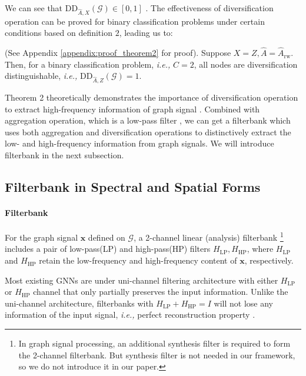 \documentclass{article}
\newcommand\ie{\textit{i.e.,}}
\newcommand{\0}{{\boldsymbol{0}}}
\newcommand{\6}{{\partial}}
\newcommand{\8}{{\infty}}
\newcommand{\4}{{\nabla}}
\newenvironment{theorem}[2][Theorem]{\begin{trivlist}
		\item[\hskip \labelsep {\bfseries #1}\hskip \labelsep {\bfseries #2.}]}{\end{trivlist}}
\begin{document}
\vspace*{-1mm}
We can see that $\mathrm{DD}_{\hat{A},X}(\mathcal{G}) \in [0,1]$ . The effectiveness of diversification operation can be proved for binary classification problems under certain conditions based on definition $2$, leading us to:
\begin{theorem} 2
(See Appendix \ref{appendix:proof_theorem2} for proof). 
Suppose $X=Z, \hat{A}=\hat{A}_{\text{rw}}$.
Then, for a binary classification problem, \ie{} $C=2$, all nodes are diversification distinguishable, \ie{} $\mathrm{DD}_{\hat{A},Z}(\mathcal{G})=1$.
\end{theorem}
Theorem 2 theoretically demonstrates the importance of diversification operation to extract high-frequency information of graph signal \cite{ekambaram2014graph}. Combined with aggregation operation, which is a low-pass filter \cite{ekambaram2014graph,maehara2019revisiting}, we can get a filterbank which uses both aggregation and diversification operations to distinctively extract the low- and high-frequency information from graph signals. We will introduce filterbank in the next subsection.

\subsection{Filterbank in Spectral and Spatial Forms}
\label{sec:filterbank_spectral_spatial}
\paragraph{Filterbank} For the graph signal $\bm{x}$ defined on $\mathcal{G}$, a 2-channel linear (analysis) filterbank \cite{ekambaram2014graph} \footnote{In graph signal processing, an additional synthesis filter \cite{ekambaram2014graph} is required to form the 2-channel filterbank. But synthesis filter is not needed in our framework, so we do not introduce it in our paper.} includes a pair of low-pass(LP) and high-pass(HP) filters $H_\text{LP}, H_\text{HP}$, where $H_\text{LP}$ and $H_\text{HP}$ retain the low-frequency and high-frequency content of $\bm{x}$, respectively.

Most existing GNNs are under uni-channel filtering architecture \cite{kipf2016classification,velivckovic2017attention,hamilton2017inductive} with either $H_\text{LP}$ or $H_\text{HP}$ channel that only partially preserves the input information. Unlike the uni-channel architecture, filterbanks with $H_\text{LP} + H_\text{HP} = I$ will not lose any information of the input signal, \ie{} perfect reconstruction property \cite{ekambaram2014graph}.
\end{document}
